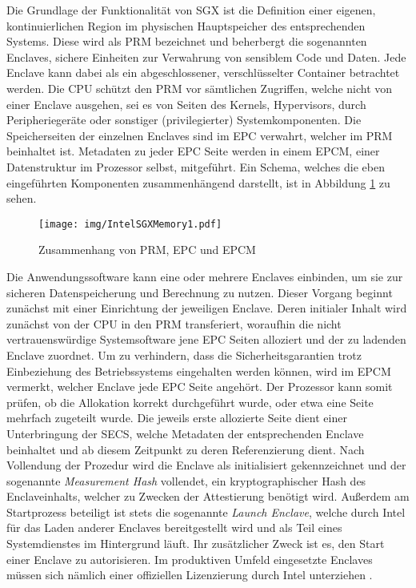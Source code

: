 Die Grundlage der Funktionalität von \ac{SGX} ist die Definition einer eigenen, kontinuierlichen Region im physischen Hauptspeicher des entsprechenden Systems. Diese wird als \ac{PRM} bezeichnet und beherbergt die sogenannten Enclaves, sichere Einheiten zur Verwahrung von sensiblem Code und Daten. Jede Enclave kann dabei als ein abgeschlossener, verschlüsselter Container betrachtet werden. Die \ac{CPU} schützt den \ac{PRM} vor sämtlichen Zugriffen, welche nicht von einer Enclave ausgehen, sei es von Seiten des Kernels, Hypervisors, durch Peripheriegeräte oder sonstiger (privilegierter) Systemkomponenten. Die Speicherseiten der einzelnen Enclaves sind im \ac{EPC} verwahrt, welcher im PRM beinhaltet ist. Metadaten zu jeder \ac{EPC} Seite werden in einem \ac{EPCM}, einer Datenstruktur im Prozessor selbst, mitgeführt. Ein Schema, welches die eben eingeführten Komponenten zusammenhängend darstellt, ist in Abbildung \ref{fig:intelsgxmemory1} zu sehen.

\begin{figure}
	\texttt{[image: img/IntelSGXMemory1.pdf]}
	\centering
	\caption{Zusammenhang von PRM, EPC und EPCM}
	\label{fig:intelsgxmemory1}
\end{figure}

Die Anwendungssoftware kann eine oder mehrere Enclaves einbinden, um sie zur sicheren Datenspeicherung und Berechnung zu nutzen. Dieser Vorgang beginnt zunächst mit einer Einrichtung der jeweiligen Enclave. Deren initialer Inhalt wird zunächst von der \ac{CPU} in den \ac{PRM} transferiert, woraufhin die nicht vertrauenswürdige Systemsoftware jene \ac{EPC} Seiten alloziert und der zu ladenden Enclave zuordnet. Um zu verhindern, dass die Sicherheitsgarantien trotz Einbeziehung des Betriebssystems eingehalten werden können, wird im \ac{EPCM} vermerkt, welcher Enclave jede EPC Seite angehört. Der Prozessor kann somit prüfen, ob die Allokation korrekt durchgeführt wurde, oder etwa eine Seite mehrfach zugeteilt wurde. Die jeweils erste allozierte Seite dient einer Unterbringung der \ac{SECS}, welche Metadaten der entsprechenden Enclave beinhaltet und ab diesem Zeitpunkt zu deren Referenzierung dient. Nach Vollendung der Prozedur wird die Enclave als initialisiert gekennzeichnet und der sogenannte \textit{Measurement Hash} vollendet, ein kryptographischer Hash des Enclaveinhalts, welcher zu Zwecken der Attestierung benötigt wird. Außerdem am Startprozess beteiligt ist stets die sogenannte \textit{Launch Enclave}, welche durch Intel für das Laden anderer Enclaves bereitgestellt wird und als Teil eines Systemdienstes im Hintergrund läuft. Ihr zusätzlicher Zweck ist es, den Start einer Enclave zu autorisieren. Im produktiven Umfeld eingesetzte Enclaves müssen sich nämlich einer offiziellen Lizenzierung durch Intel unterziehen \cite{Costan2016}.

